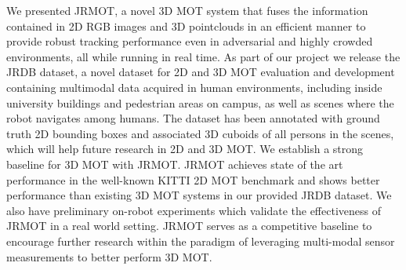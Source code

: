 \documentclass[letterpaper, 10 pt, conference]{ieeeconf}
\newcommand{\jrdb}{JRDB\xspace}
\newcommand{\methodname}{{JRMOT}\xspace}
\begin{document}
We presented \methodname, a novel 3D MOT system that fuses the information contained in 2D RGB images and 3D pointclouds in an efficient manner to provide robust tracking performance even in adversarial and highly crowded environments, all while running in real time. 
As part of our project we release the \jrdb dataset, a novel dataset for 2D and 3D MOT evaluation and development containing multimodal data acquired in human environments, including inside university buildings and pedestrian areas on campus, as well as scenes where the robot navigates among humans. 
The dataset has been annotated with ground truth 2D bounding boxes and associated 3D cuboids of all persons in the scenes, which will help future research in 2D and 3D MOT. We establish a strong baseline for 3D MOT with \methodname.
\methodname achieves state of the art performance in the well-known KITTI 2D MOT benchmark and shows better performance than existing 3D MOT systems in our provided \jrdb dataset. We also have preliminary on-robot experiments which validate the effectiveness of JRMOT in a real world setting. \methodname serves as a competitive baseline to encourage further research within the paradigm of leveraging multi-modal sensor measurements to better perform 3D MOT. 
%
 
	
\end{document}
